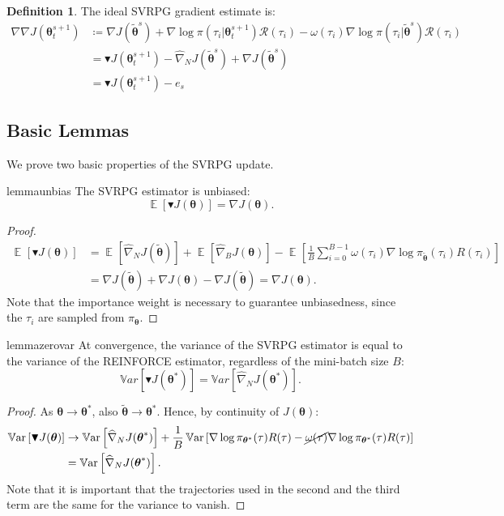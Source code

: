 \documentclass{article}
\theoremstyle{remark}
\theoremstyle{definition}
\newtheorem{definition}{Definition}[section]
\DeclareMathOperator*{\EV}{\mathbb{E}}
\DeclareMathOperator*{\Var}{\mathbb{V}ar}
\newcommand{\EVV}[2][\ppvect \in \ppspace]{\EV_{#1}\left[{#2}\right]}
\newcommand{\dnabla}{\nabla\!\!\!\!\nabla}
\newcommand{\vtheta}{\boldsymbol{\theta}}
\newcommand{\Reward}{\mathcal{R}}
\newcommand{\score}[2]{\nabla\log\pi_{#1}(#2)}
\newcommand{\gradJ}[1]{\nabla J(#1)}
\newcommand{\gradApp}[2]{\widehat{\nabla}_{#2}J(#1)}
\newcommand{\gradBlack}[1]{\blacktriangledown J(#1)}
\newcommand{\gradIdeal}[1]{\dnabla J(#1)}
\begin{document}
\begin{definition}\label{def:ideal}
The ideal SVRPG gradient estimate is:
\begin{align*}
	\gradIdeal{\vtheta_t^{s+1}} &\coloneqq 
	\gradJ{\tilde{\vtheta}^s}
	+ \nabla\log\pi(\tau_i \vert \vtheta_t^{s+1})\Reward(\tau_i) 
	- \omega(\tau_i)\nabla\log\pi(\tau_i \vert \tilde{\vtheta}^s)\Reward(\tau_i) \\
	&= \gradBlack{\vtheta_t^{s+1}} - \gradApp{\tilde{\vtheta}^s}{N} + \gradJ{\tilde{\vtheta}^s} \\
	&= \gradBlack{\vtheta_t^{s+1}} - e_s
\end{align*}
\end{definition}


\subsection*{Basic Lemmas}
We prove two basic properties of the SVRPG update.

\begin{restatable}{lemma}{unbias}\label{lemma:unbias}
The SVRPG estimator is unbiased:
\[
\mathop{\mathbb{E}}
\left[\blacktriangledown J(\vtheta)\right] = \gradJ{\vtheta}.
\]
\end{restatable}
\begin{proof}
\begin{align*}
\EVV[]{\gradBlack{\vtheta}} &= \EVV[]{\gradApp{\tilde{\vtheta}}{N}}  + \EVV[]{\gradApp{\vtheta}{B}} - \EVV[]{\frac{1}{B}\sum_{i=0}^{B-1}\omega(\tau_i)\score{\tilde{\vtheta}}{\tau_i}R(\tau_i)} \\
&= \gradJ{\tilde{\vtheta}} + \gradJ{\vtheta} - \gradJ{\tilde{\vtheta}} = \gradJ{\vtheta}.
\end{align*}
Note that the importance weight is necessary to guarantee unbiasedness, since the $\tau_i$ are sampled from $\pi_{\vtheta}$.
\end{proof}

\begin{restatable}{lemma}{zerovar}\label{lemma:zerovar}
At convergence, the variance of the SVRPG estimator is equal to the variance of the REINFORCE estimator, regardless of the mini-batch size $B$:
\[
	\mathbb{V}ar\left[\gradBlack{\vtheta^*}\right] = 
	\mathbb{V}ar\left[\gradApp{\vtheta^*}{N}\right].
\]
\end{restatable}
\begin{proof}
As $\vtheta\to\vtheta^*$, also $\tilde{\vtheta}\to\vtheta^*$. Hence, by continuity of $J(\vtheta)$:
\begin{align*}
\Var\left[\gradBlack{\vtheta}\right] &\to \Var\left[\gradApp{\vtheta^*}{N}\right] + \frac{1}{B}\Var\left[\score{\vtheta^*}{\tau}R(\tau) - \cancel{\omega(\tau)}\score{\vtheta^*}{\tau}R(\tau)\right] \\
&= \Var\left[\gradApp{\vtheta^*}{N}\right].
\end{align*}
Note that it is important that the trajectories used in the second and the third term are the same for the variance to vanish.
\end{proof}
\end{document}
